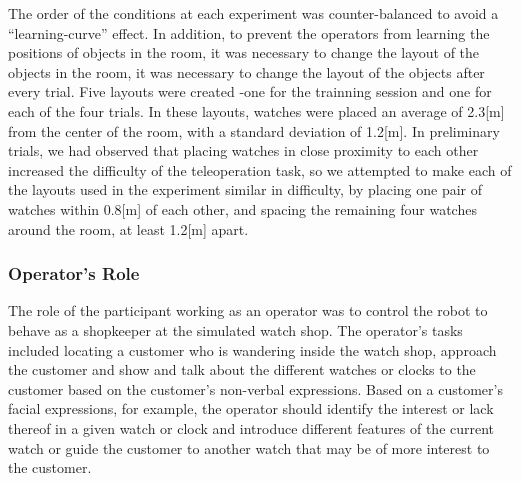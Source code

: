 \documentclass[journal]{IEEEtran}
\begin{document}
The order of the conditions at each experiment was counter-balanced to avoid a ``learning-curve'' effect.
In addition, to prevent the operators from learning the positions of objects in the room, it was necessary to change the layout of the objects in the room, it was necessary to change the layout of the objects after every trial.
Five layouts were created -one for the trainning session and one for each of the four trials. 
In these layouts, watches were placed an average of 2.3[m] from the center of the room, with a standard deviation of 1.2[m].
In preliminary trials, we had observed that placing watches in close proximity to each other increased the difficulty of the teleoperation task, so we attempted to make each of the layouts used in the experiment similar in difficulty, by placing one pair of watches within 0.8[m] of each other, and spacing the remaining four watches around the room, at least 1.2[m] apart.

\subsubsection{Operator's Role}
The role of the participant working as an operator was to control the robot to behave as a shopkeeper at the simulated watch shop.
The operator's tasks included locating a customer who is wandering inside the watch shop, approach the customer and show and talk about the different watches or clocks to the customer based on the customer's non-verbal expressions.
Based on a customer's facial expressions, for example, the operator should identify the interest or lack thereof in a given watch or clock and introduce different features of the current watch or guide the customer to another watch that may be of more interest to the customer.
\end{document}

